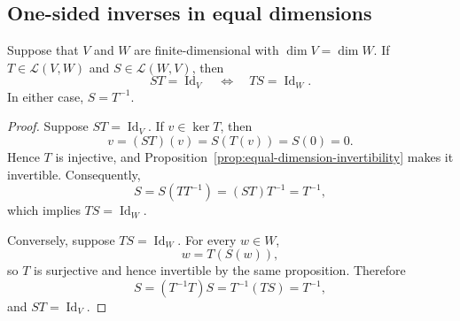 \subsection{One-sided inverses in equal dimensions}

\begin{proposition}\label{prop:one-sided-inverse}
  Suppose that $V$ and $W$ are finite-dimensional with
  $\dim V=\dim W$. If $T\in\mathcal L(V,W)$ and
  $S\in\mathcal L(W,V)$, then
  \[
    ST=\operatorname{Id}_V
    \quad\Longleftrightarrow\quad
    TS=\operatorname{Id}_W.
  \]
  In either case, $S=T^{-1}$.
\end{proposition}

\begin{proof}
  Suppose $ST=\operatorname{Id}_V$. If $v\in\ker T$, then
  \[
    v=(ST)(v)=S(T(v))=S(0)=0.
  \]
  Hence $T$ is injective, and
  Proposition~\ref{prop:equal-dimension-invertibility} makes it
  invertible. Consequently,
  \[
    S=S(TT^{-1})=(ST)T^{-1}=T^{-1},
  \]
  which implies $TS=\operatorname{Id}_W$.

  Conversely, suppose $TS=\operatorname{Id}_W$. For every $w\in W$,
  \[
    w=T(S(w)),
  \]
  so $T$ is surjective and hence invertible by the same proposition.
  Therefore
  \[
    S=(T^{-1}T)S=T^{-1}(TS)=T^{-1},
  \]
  and $ST=\operatorname{Id}_V$.
\end{proof}
